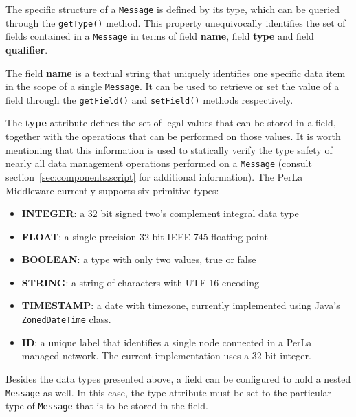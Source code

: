 The specific structure of a \texttt{Message} is defined by its type, which can
be queried through the \texttt{getType()} method. This property unequivocally
identifies the set of fields contained in a \texttt{Message} in terms of field
\textbf{name}, field \textbf{type} and field \textbf{qualifier}.

The field \textbf{name} is a textual string that uniquely identifies one
specific data item in the scope of a single \texttt{Message}. It can be used to
retrieve or set the value of a field through the \texttt{getField()} and
\texttt{setField()} methods respectively.

The \textbf{type} attribute defines the set of legal values that can be stored
in a field, together with the operations that can be performed on those values.
It is worth mentioning that this information is used to statically verify
the type safety of nearly all data management operations performed on a
\texttt{Message} (consult section~\ref{sec:components.script} for additional
information). The PerLa Middleware currently supports six primitive types:

\begin{itemize}

  \item \textbf{INTEGER}: a 32 bit signed two's complement integral data type

  \item \textbf{FLOAT}: a single-precision 32 bit IEEE 745 floating point

  \item \textbf{BOOLEAN}: a type with only two values, true or false

  \item \textbf{STRING}: a string of characters with UTF-16 encoding

  \item \textbf{TIMESTAMP}: a date with timezone, currently implemented using
      Java's \texttt{ZonedDateTime} class.

  \item \textbf{ID}: a unique label that identifies a single node connected in
      a PerLa managed network. The current implementation uses a 32 bit
      integer. 

\end{itemize}

Besides the data types presented above, a field can be configured to hold a
nested \texttt{Message} as well. In this case, the type attribute must be set
to the particular type of \texttt{Message} that is to be stored in the field. 


